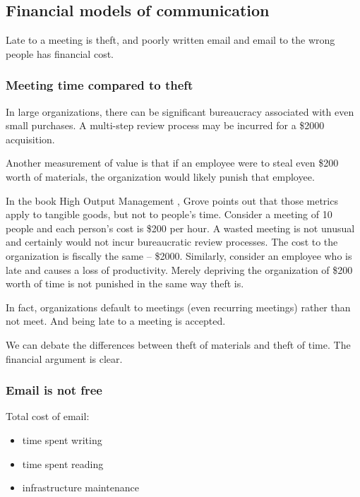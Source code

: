 \subsection{Financial models of communication}

Late to a meeting is theft, and poorly written email and email to the wrong people has financial cost.

\subsubsection{Meeting time compared to theft}

In large organizations, there can be significant bureaucracy associated with even small purchases. A multi-step review process may be incurred for a \$2000 acquisition.

Another measurement of value is that if an employee were to steal even \$200 worth of materials, the organization would likely punish that employee.


In the book High Output Management \cite{1995_Grove}, Grove points out that those metrics apply to tangible goods, but not to people's time. Consider a meeting of 10 people and each person's cost is \$200 per hour. A wasted meeting is not unusual and certainly would not incur bureaucratic review processes. The cost to the organization is fiscally the same -- \$2000. Similarly, consider an employee who is late and causes a loss of productivity. Merely depriving the organization of \$200 worth of time is not punished in the same way theft is.

In fact, organizations default to meetings (even recurring meetings) rather than not meet. And being late to a meeting is accepted. 

We can debate the differences between theft of materials and theft of time. The financial argument is clear. 


\subsubsection{Email is not free}

Total cost of email:
\begin{itemize}
    \item time spent writing
    \item time spent reading
    \item infrastructure maintenance
\end{itemize}

